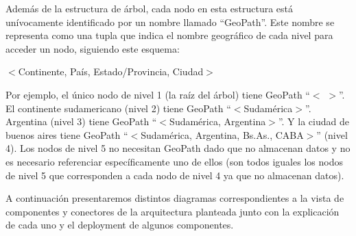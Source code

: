 Además de la estructura de árbol, cada nodo en esta estructura está unívocamente identificado por un nombre llamado ``GeoPath''. Este nombre se representa como una tupla que indica el nombre geográfico de cada nivel para acceder un nodo, siguiendo este esquema:
\begin{center}
	$<$Continente, País, Estado/Provincia, Ciudad$>$
\end{center}

Por ejemplo, el único nodo de nivel 1 (la raíz del árbol) tiene GeoPath ``$<$ $>$''. El continente sudamericano (nivel 2) tiene GeoPath ``$<$Sudamérica$>$''. Argentina (nivel 3) tiene GeoPath ``$<$Sudamérica, Argentina$>$''. Y la ciudad de buenos aires tiene GeoPath ``$<$Sudamérica, Argentina, Bs.As., CABA$>$'' (nivel 4). Los nodos de nivel 5 no necesitan GeoPath dado que no almacenan datos y no es necesario referenciar específicamente uno de ellos (son todos iguales los nodos de nivel 5 que corresponden a cada nodo de nivel 4 ya que no almacenan datos).



A continuación presentaremos distintos diagramas correspondientes a la vista de componentes y conectores de la arquitectura planteada junto con la explicación de cada uno y el deployment de algunos componentes.